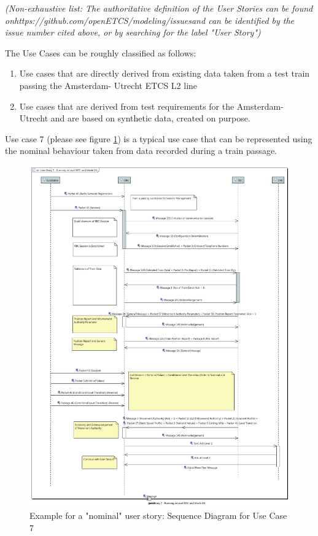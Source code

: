 \documentclass{template/openetcs_article}
\begin{document}
\emph{(Non-exhaustive list: The authoritative definition of the User Stories can be found on\newline https://github.com/openETCS/modeling/issues\newline and can be identified by the issue number cited above, or by searching for the label "User Story")}

The Use Cases can be roughly classified as follows:
\begin{enumerate}
 \item Use cases that are directly derived from existing data taken from a test train passing the Amsterdam- Utrecht ETCS L2 line
 \item Use cases that are derived from test requirements for the Amsterdam- Utrecht and are based on synthetic data, created on purpose.
\end {enumerate}

Use case 7 (please see figure \ref{fig:us07}) is a typical use case that can be represented using the nominal behaviour taken from data recorded during a train passage.

\begin{figure}
  \centering
  \includegraphics[width=\textwidth]{images/UserStory7-2-sequence}
  \caption{Example for a "nominal" user story: Sequence Diagram for Use Case 7}
  \label{fig:us07}
\end{figure}
\end{document}
